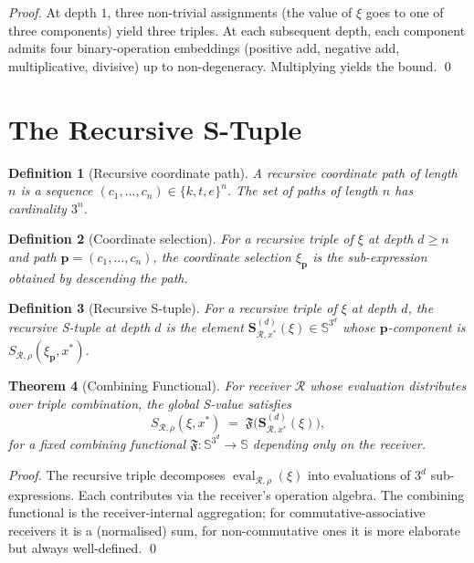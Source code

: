 \documentclass[twocolumn,a4paper]{article}
\newtheorem{theorem}{Theorem}[section]
\newtheorem{definition}[theorem]{Definition}
\DeclareMathOperator{\eval}{eval}
\newcommand{\Sscale}{\mathbb{S}}
\newcommand{\receiver}{\mathcal{R}}
\newcommand{\Sscalar}{S}
\newcommand{\Stuple}{\mathbf{S}}
\begin{document}
\begin{proof}
At depth $1$, three non-trivial assignments (the value of $\xi$ goes to one of three components) yield three triples. At each subsequent depth, each component admits four binary-operation embeddings (positive add, negative add, multiplicative, divisive) up to non-degeneracy. Multiplying yields the bound. \qed
\end{proof}

\section{The Recursive S-Tuple}
\label{sec:rec-s-tuple}

\begin{definition}[Recursive coordinate path]
\label{def:rec-coord-path}
A \emph{recursive coordinate path} of length $n$ is a sequence $(c_{1},\ldots,c_{n})\in\{k,t,e\}^{n}$. The set of paths of length $n$ has cardinality $3^{n}$.
\end{definition}

\begin{definition}[Coordinate selection]
\label{def:coord-sel}
For a recursive triple of $\xi$ at depth $d\geq n$ and path $\bm{p}=(c_{1},\ldots,c_{n})$, the \emph{coordinate selection} $\xi_{\bm{p}}$ is the sub-expression obtained by descending the path.
\end{definition}

\begin{definition}[Recursive S-tuple]
\label{def:rec-s-tuple}
For a recursive triple of $\xi$ at depth $d$, the \emph{recursive S-tuple at depth $d$} is the element $\Stuple^{(d)}_{\receiver,x^{*}}(\xi)\in\Sscale^{3^{d}}$ whose $\bm{p}$-component is $\Sscalar_{\receiver,\rho}(\xi_{\bm{p}},x^{*})$.
\end{definition}

\begin{theorem}[Combining Functional]
\label{thm:combining-functional}
For receiver $\receiver$ whose evaluation distributes over triple combination, the global S-value satisfies
\[
\Sscalar_{\receiver,\rho}(\xi,x^{*})\;=\;\mathfrak{F}\bigl(\Stuple^{(d)}_{\receiver,x^{*}}(\xi)\bigr),
\]
for a fixed combining functional $\mathfrak{F}\colon\Sscale^{3^{d}}\to\Sscale$ depending only on the receiver.
\end{theorem}

\begin{proof}
The recursive triple decomposes $\eval_{\receiver,\rho}(\xi)$ into evaluations of $3^{d}$ sub-expressions. Each contributes via the receiver's operation algebra. The combining functional is the receiver-internal aggregation; for commutative-associative receivers it is a (normalised) sum, for non-commutative ones it is more elaborate but always well-defined. \qed
\end{proof}
\end{document}
